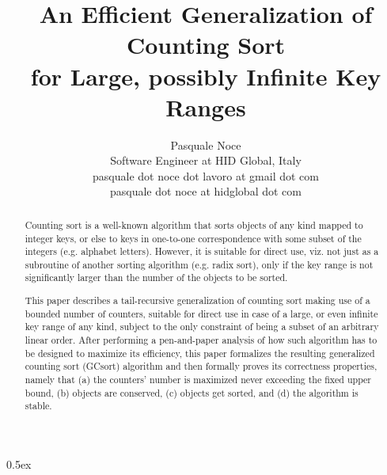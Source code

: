 \documentclass[11pt,a4paper,fleqn]{article}
\begin{document}
\title{An Efficient Generalization of Counting Sort\\for Large, possibly Infinite Key Ranges}
\author{Pasquale Noce\\Software Engineer at HID Global, Italy\\pasquale dot noce dot lavoro at gmail dot com\\pasquale dot noce at hidglobal dot com}
\maketitle

\begin{abstract}
Counting sort is a well-known algorithm that sorts objects of any kind mapped to
integer keys, or else to keys in one-to-one correspondence with some subset of
the integers (e.g. alphabet letters). However, it is suitable for direct use,
viz. not just as a subroutine of another sorting algorithm (e.g. radix sort),
only if the key range is not significantly larger than the number of the objects
to be sorted.

This paper describes a tail-recursive generalization of counting sort making use
of a bounded number of counters, suitable for direct use in case of a large, or
even infinite key range of any kind, subject to the only constraint of being a
subset of an arbitrary linear order. After performing a pen-and-paper analysis
of how such algorithm has to be designed to maximize its efficiency, this paper
formalizes the resulting generalized counting sort (GCsort) algorithm and then
formally proves its correctness properties, namely that (a) the counters' number
is maximized never exceeding the fixed upper bound, (b) objects are conserved,
(c) objects get sorted, and (d) the algorithm is stable.
\end{abstract}

\tableofcontents

\parindent 0pt\parskip 0.5ex





\end{document}

